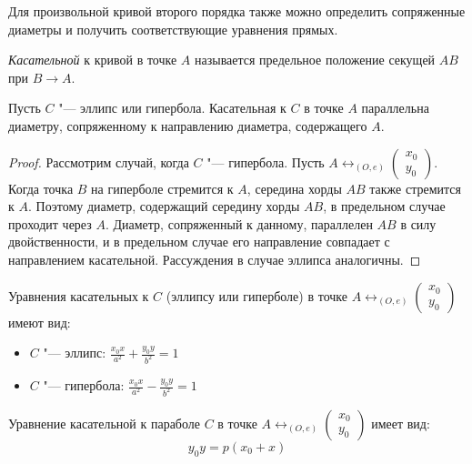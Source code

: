 \begin{note}
	Для произвольной кривой второго порядка также можно определить сопряженные диаметры и получить соответствующие уравнения прямых.
\end{note}

\begin{definition}
	\textit{Касательной} к кривой в точке $A$ называется предельное положение секущей $AB$ при $B \rightarrow A$.
\end{definition}

\begin{proposition}
	Пусть $C$ "--- эллипс или гипербола. Касательная к $C$ в точке $A$ параллельна диаметру, сопряженному к направлению диаметра, содержащего $A$.
\end{proposition}

\begin{proof}
	Рассмотрим случай, когда $C$ "--- гипербола. Пусть $A \leftrightarrow_{(O, e)} \begin{pmatrix}x_0\\y_0\end{pmatrix}$. Когда точка $B$ на гиперболе стремится к $A$, середина хорды $AB$ также стремится к $A$. Поэтому диаметр, содержащий середину хорды $AB$, в предельном случае проходит через $A$. Диаметр, сопряженный к данному, параллелен $AB$ в силу двойственности, и в предельном случае его направление совпадает с направлением касательной. Рассуждения в случае эллипса аналогичны.
\end{proof}

\begin{corollary}
	Уравнения касательных к $C$ (эллипсу или гиперболе) в точке $A \leftrightarrow_{(O, e)} \begin{pmatrix}x_0\\y_0\end{pmatrix}$ имеют вид:
	\begin{itemize}
		\item $C$ "--- эллипс: $\frac{x_0x}{a^2} + \frac{y_0y}{b^2} = 1$
		\item $C$ "--- гипербола: $\frac{x_0x}{a^2} - \frac{y_0y}{b^2} = 1$
	\end{itemize}
\end{corollary}

\begin{proposition}
	Уравнение касательной к параболе $C$ в точке $A \leftrightarrow_{(O, e)} \begin{pmatrix}x_0\\y_0\end{pmatrix}$ имеет вид:
	\[y_0y = p(x_0 + x)\]
\end{proposition}

